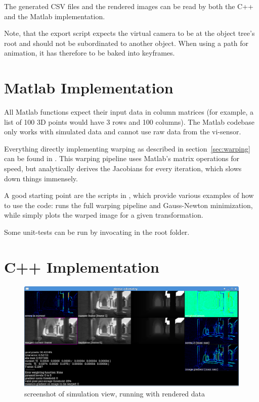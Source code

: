 The generated CSV files and the rendered images can be read by both the C++ and
the Matlab implementation.

Note, that the export script expects the virtual camera to be at the object
tree's root and should not be subordinated to another object. When using a path
for animation, it has therefore to be baked into keyframes.


\section{Matlab Implementation}

All Matlab functions expect their input data in column matrices (for example, a
list of 100 3D points would have 3 rows and 100 columns). The Matlab codebase
only works with simulated data and cannot use raw data from the vi-sensor.

Everything directly implementing warping as described in
section~\ref{sec:warping} can be found in . This warping pipeline
uses Matlab's matrix operations for speed, but analytically derives the
Jacobians for every iteration, which slows down things immensely.

A good starting point are the scripts in , which provide
various examples of how to use the code:  runs the
full warping pipeline and Gauss-Newton minimization, while
 simply plots the warped image for a given
transformation.

Some unit-tests can be run by invocating  in the root folder.


\section{C++ Implementation}

\begin{figure}[h]
    \centering
    \includegraphics[width=\textwidth]{images/pc_app_screenshot_sim.png}
    \caption{screenshot of simulation view, running with rendered data}
    \label{fig:screenshot}
\end{figure}

